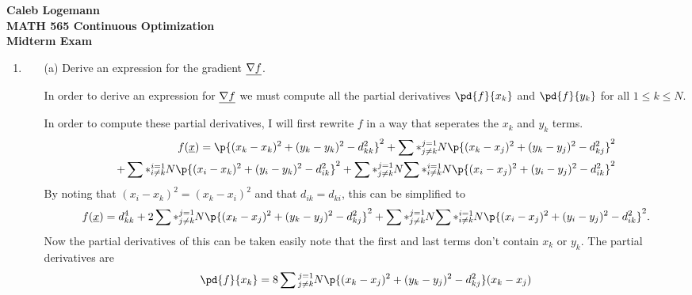 \documentclass[11pt, oneside]{article}
\begin{document}
\noindent \textbf{\Large{Caleb Logemann \\
MATH 565 Continuous Optimization \\
Midterm Exam
}}

%
\begin{enumerate}
  \item %
    \begin{enumerate}
      \item[(a)] %
        Derive an expression for the gradient $\underline{\nabla f}$.

        In order to derive an expression for $\underline{\nabla f}$ we must compute all
        the partial derivatives $\pd{f}{x_k}$ and $\pd{f}{y_k}$ for all
        $1 \le k \le N$.

        In order to compute these partial derivatives, I will first rewrite $f$
        in a way that seperates the $x_k$ and $y_k$ terms.
        \begin{align*}
          f(\v{x}) = \p{(x_k - x_k)^2 + (y_k - y_k)^2 - d_{kk}^2}^2
          + \sum*{\substack{j = 1 \\ j \neq k}}{N}{\p{(x_k - x_j)^2 + (y_k - y_j)^2 - d_{kj}^2}^2} \\
          + \sum*{\substack{i = 1 \\ i \neq k}}{N}{\p{(x_i - x_k)^2 + (y_i - y_k)^2 - d_{ik}^2}^2}
          + \sum*{\substack{j = 1 \\ j \neq k}}{N}{\sum*{\substack{i = 1 \\ i \neq k}}{N}{\p{(x_i - x_j)^2 + (y_i - y_j)^2 - d_{ik}^2}^2}}
        \end{align*}
        By noting that $(x_i - x_k)^2 = (x_k - x_i)^2$ and that $d_{ik} = d_{ki}$,
        this can be simplified to
        \begin{align*}
          f(\v{x}) = d_{kk}^4
          + 2\sum*{\substack{j = 1 \\ j \neq k}}{N}{\p{(x_k - x_j)^2 + (y_k - y_j)^2 - d_{kj}^2}^2}
          + \sum*{\substack{j = 1 \\ j \neq k}}{N}{\sum*{\substack{i = 1 \\ i \neq k}}{N}{\p{(x_i - x_j)^2 + (y_i - y_j)^2 - d_{ik}^2}^2}}.
        \end{align*}
        Now the partial derivatives of this can be taken easily note that the
        first and last terms don't contain $x_k$ or $y_k$.
        The partial derivatives are
        \begin{align*}
          \pd{f}{x_k} &= 8 \sum{\substack{j = 1 \\ j \neq k}}{N}{\p{(x_k - x_j)^2 + (y_k - y_j)^2 - d_{kj}^2}(x_k - x_j)} \\

\end{align*}
\end{enumerate}
\end{enumerate}
\end{document}
